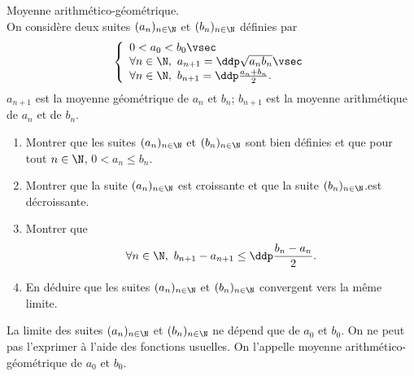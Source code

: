 
\begin{exercice} Moyenne arithm\'etico-g\'eom\'etrique.\\
\noindent On consid\`ere deux suites $(a_n)_{n\in\N}$ et $(b_n)_{n\in\N}$ d\'efinies par 
$$\left\lbrace\begin{array}{l}
0<a_0<b_0\vsec\\
\forall n\in\N,\ a_{n+1}=\ddp\sqrt{a_nb_n}\vsec\\
\forall n\in\N,\ b_{n+1}=\ddp\frac{a_n+b_n}{2}.
\end{array}\right.$$
$a_{n+1}$ est la moyenne g\'eom\'etrique de $a_n$ et $b_n$; $b_{n+1}$ est la moyenne arithm\'etique de $a_n$ et de $b_n$.
\begin{enumerate}
 \item 
Montrer que les suites $(a_n)_{n\in\N}$ et $(b_n)_{n\in\N}$ sont bien d\'efinies et que pour tout $n\in\N$, $0<a_n\leq b_n$.
\item 
Montrer que la suite $(a_n)_{n\in\N}$ est croissante et que la suite $(b_n)_{n\in\N}$.est d\'ecroissante.
\item 
Montrer que
$$\forall n\in\N,\ b_{n+1}-a_{n+1}\leq \ddp\frac{b_n-a_n}{2}.$$
\item 
En d\'eduire que les suites $(a_n)_{n\in\N}$ et $(b_n)_{n\in\N}$ convergent vers la m\^eme limite.
\end{enumerate}
La limite des suites $(a_n)_{n\in\N}$ et $(b_n)_{n\in\N}$ ne d\'epend que de $a_0$ et $b_0$. On ne peut pas l'exprimer \`a l'aide des fonctions usuelles. On l'appelle moyenne arithm\'etico-g\'eom\'etrique de $a_0$ et $b_0$.
\end{exercice}

